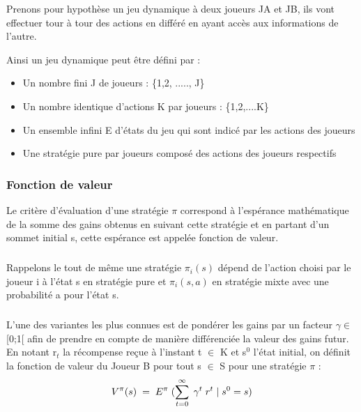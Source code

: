 \documentclass[a4paper, 12pt, twoside]{article}
\begin{document}
{{{{Prenons pour hypothèse un jeu dynamique à deux joueurs  JA et JB, ils vont effectuer tour à tour des actions en différé en ayant accès aux informations de l'autre. \newline

Ainsi un \textsf{jeu dynamique} peut être défini par : 
\begin{itemize}
\item Un nombre fini J de joueurs : \{1,2, ....., J\}
\item Un nombre identique d'actions K par joueurs : \{1,2,....K\}  
\item Un ensemble infini E d'états du jeu qui sont indicé par les actions des joueurs 
\item Une stratégie pure par joueurs composé des actions des joueurs respectifs
\end{itemize}

\subsubsection{Fonction de valeur}
Le critère d'évaluation d'une stratégie $\pi$ correspond à l'espérance mathématique de la somme des gains obtenus en suivant cette stratégie et en partant d'un sommet initial \textsf{s},  cette espérance est appelée \textsf{fonction de valeur}.

\subparagraph*{}{Rappelons le tout de même une stratégie $\pi_{i}(s)$ dépend de l'action choisi par le joueur \textsf{i} à l'état \textsf{s} en stratégie pure et $\pi_{i}(s,a)$ en stratégie mixte avec une probabilité \textsf{a} pour l'état \textsf{s}}.

\subparagraph*{}{L'une des variantes les plus connues est de pondérer les gains par un facteur $\gamma \in $ [0;1[ afin de prendre en compte de manière différenciée la valeur des gains futur. En notant r$_{t}$ la récompense reçue à l'instant \textsf{t} $ \in $ K et \textsf{s$^{0}$} l'état initial, on définit la \textsf{fonction de valeur} du Joueur B pour tout \textsf{s} $\in $ S pour une stratégie $ \pi$ :}
\begin{align*}
V^{\pi}(s) \hspace{0,1 cm} = \hspace{0,1 cm} E^{\pi}\hspace{0,1 cm} (\sum_{t=0}^{\infty} \hspace{0,1cm}\gamma ^{t} \hspace{0,1cm} r^{t}\hspace{0,1cm} |\hspace{0,1cm} s^{0} = s )
\end{align*}


}}}}
\end{document}
